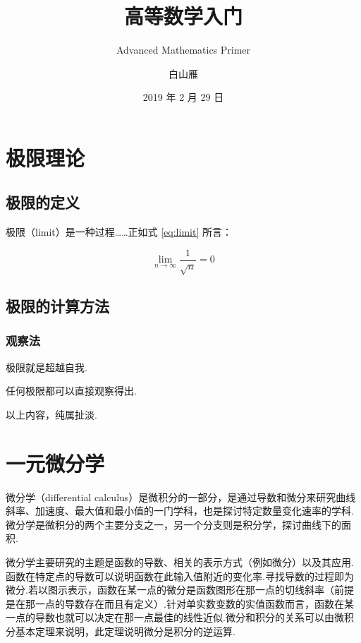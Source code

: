 \documentclass[
    b5paper,  %
    decoration,  %
]{qyxf-book}
\title{高等数学入门}
\subtitle{Advanced Mathematics Primer}  %
\author{白山雁}
\date{2019 年 2 月 29 日}
\begin{document}
\maketitle

\tableofcontents

\chapter{极限理论}
\section{极限的定义}

极限（limit）是一种过程……正如式 \eqref{eq:limit} 所言：

\begin{equation}\label{eq:limit}
\lim_{n\to\infty}\frac1{\sqrt n} = 0
\end{equation}

\section{极限的计算方法}
\subsection{观察法}

\begin{define}
    极限就是超越自我.
\end{define}

\begin{theorem}
    任何极限都可以直接观察得出.
\end{theorem}

\begin{lemma}
    以上内容，纯属扯淡.
\end{lemma}

\chapter{一元微分学}


微分学（differential calculus）是微积分的一部分，是通过导数和微分来研究曲线斜率、加速度、最大值和最小值的一门学科，也是探讨特定数量变化速率的学科.微分学是微积分的两个主要分支之一，另一个分支则是积分学，探讨曲线下的面积.

微分学主要研究的主题是函数的导数、相关的表示方式（例如微分）以及其应用.函数在特定点的导数可以说明函数在此输入值附近的变化率.寻找导数的过程即为微分.若以图示表示，函数在某一点的微分是函数图形在那一点的切线斜率（前提是在那一点的导数存在而且有定义）.针对单实数变数的实值函数而言，函数在某一点的导数也就可以决定在那一点最佳的线性近似.微分和积分的关系可以由微积分基本定理来说明，此定理说明微分是积分的逆运算.
\end{document}
